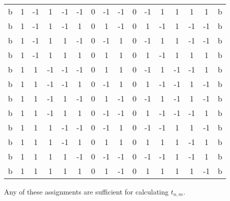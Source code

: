 \documentclass[12pt]{article}
\theoremstyle{plain}
\theoremstyle{definition}
\theoremstyle{remark}
\theoremstyle{definition}
\begin{document}
\begin{center}
\begin{tabular}{|c|c|c|c|c|c|c|c|c|c|c|c|c|c|c|c|}
b & 1 & -1 & 1 & -1 & -1 & 0 & -1 & -1 & 0 & -1 & 1 & 1 & 1 & 1 & b \\
b & 1 & -1 & 1 & -1 & 1 & 0 & 1 & -1 & 0 & 1 & -1 & 1 & -1 & -1 & b \\
b & 1 & -1 & 1 & 1 & -1 & 0 & -1 & 1 & 0 & -1 & 1 & 1 & -1 & -1 & b \\
b & 1 & -1 & 1 & 1 & 1 & 0 & 1 & 1 & 0 & 1 & -1 & 1 & 1 & 1 & b \\
b & 1 & 1 & -1 & -1 & -1 & 0 & 1 & 1 & 0 & -1 & 1 & -1 & -1 & 1 & b \\
b & 1 & 1 & -1 & -1 & 1 & 0 & -1 & 1 & 0 & 1 & -1 & -1 & 1 & -1 & b \\
b & 1 & 1 & -1 & 1 & -1 & 0 & 1 & -1 & 0 & -1 & 1 & -1 & 1 & -1 & b \\
b & 1 & 1 & -1 & 1 & 1 & 0 & -1 & -1 & 0 & 1 & -1 & -1 & -1 & 1 & b \\
b & 1 & 1 & 1 & -1 & -1 & 0 & -1 & 1 & 0 & -1 & -1 & 1 & 1 & -1 & b \\
b & 1 & 1 & 1 & -1 & 1 & 0 & 1 & 1 & 0 & 1 & 1 & 1 & -1 & 1 & b \\
b & 1 & 1 & 1 & 1 & -1 & 0 & -1 & -1 & 0 & -1 & -1 & 1 & -1 & 1 & b \\
b & 1 & 1 & 1 & 1 & 1 & 0 & 1 & -1 & 0 & 1 & 1 & 1 & 1 & -1 & b \\
\hline
\end{tabular}
\end{center}

Any of these assignments are sufficient for calculating $t_{n,m}$. 

\printbibliography
\end{document}
